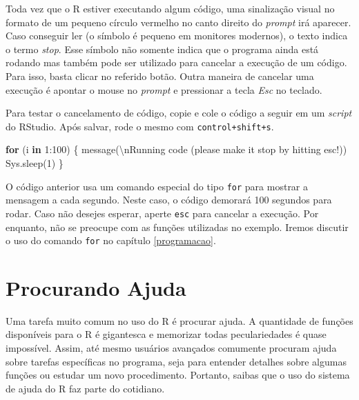 \documentclass[
  11pt,
]{book}
\newenvironment{Shaded}{\begin{snugshade}}{\end{snugshade}}
\newcommand{\ControlFlowTok}[1]{\textcolor[rgb]{0.27,0.27,0.27}{\textbf{#1}}}
\newcommand{\DecValTok}[1]{\textcolor[rgb]{0.06,0.06,0.06}{#1}}
\newcommand{\FunctionTok}[1]{\textcolor[rgb]{0,0,0}{#1}}
\newcommand{\NormalTok}[1]{#1}
\newcommand{\SpecialCharTok}[1]{\textcolor[rgb]{0,0,0}{#1}}
\newcommand{\StringTok}[1]{\textcolor[rgb]{0.5,0.5,0.5}{#1}}
\begin{document}
Toda vez que o R estiver executando algum código, uma sinalização visual no formato de um pequeno círculo vermelho no canto direito do \emph{prompt} irá aparecer. Caso conseguir ler (o símbolo é pequeno em monitores modernos), o texto indica o termo \emph{stop}. Esse símbolo não somente indica que o programa ainda está rodando mas também pode ser utilizado para cancelar a execução de um código. Para isso, basta clicar no referido botão. Outra maneira de cancelar uma execução é apontar o mouse no \emph{prompt} e pressionar a tecla \emph{Esc} no teclado.

Para testar o cancelamento de código, copie e cole o código a seguir em um \emph{script} do RStudio. Após salvar, rode o mesmo com \texttt{control+shift+s}.

\begin{Shaded}
\begin{Highlighting}[]
\ControlFlowTok{for}\NormalTok{ (i }\ControlFlowTok{in} \DecValTok{1}\SpecialCharTok{:}\DecValTok{100}\NormalTok{) \{}
  \FunctionTok{message}\NormalTok{(}\StringTok{\textquotesingle{}}\SpecialCharTok{\textbackslash{}n}\StringTok{Running code (please make it stop by hitting esc!)\textquotesingle{}}\NormalTok{)}
  \FunctionTok{Sys.sleep}\NormalTok{(}\DecValTok{1}\NormalTok{)}
\NormalTok{\}}
\end{Highlighting}
\end{Shaded}

O código anterior usa um comando especial do tipo \texttt{for} para mostrar a mensagem a cada segundo. Neste caso, o código demorará 100 segundos para rodar. Caso não desejes esperar, aperte \texttt{esc} para cancelar a execução. Por enquanto, não se preocupe com as funções utilizadas no exemplo. Iremos discutir o uso do comando \texttt{for} no capítulo \ref{programacao}.

\hypertarget{procurando-ajuda}{%
\section{Procurando Ajuda}\label{procurando-ajuda}}

Uma tarefa muito comum no uso do R é procurar ajuda. A quantidade de funções disponíveis para o R é gigantesca e memorizar todas peculariedades é quase impossível. Assim, até mesmo usuários avançados comumente procuram ajuda sobre tarefas específicas no programa, seja para entender detalhes sobre algumas funções ou estudar um novo procedimento. Portanto, saibas que o uso do sistema de ajuda do R faz parte do cotidiano.
\end{document}
